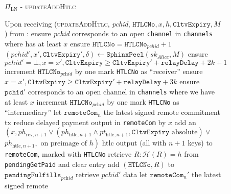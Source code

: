   \begin{figure}[H]
    \begin{protocolbox}{$\Pi_{\mathrm{LN}}$ - \textsc{updateAddHtlc}}
      \begin{algorithmic}[1]
        \State Upon receiving (\textsc{updateAddHtlc}, \textit{pchid},
        $\mathtt{HTLCNo}, x, h, \mathtt{CltvExpiry}, M$) from \bob:
        \Indent
          \State ensure \textit{pchid} corresponds to an open \texttt{channel}
          in \texttt{channels} where \bob{} has at least $x$
          \State ensure $\mathtt{HTLCNo} = \mathtt{HTLCNo}_{\mathit{pchid}} + 1$
          \State $\left(\mathit{pchid}', x', \mathtt{CltvExpiry}',
          \delta\right) \gets \mathtt{SphinxPeel}\left(sk_{\textit{Alice}},
          M\right)$
            \State ensure $\mathit{pchid}' = \bot, x = x', \mathtt{CltvExpiry}
            \geq \mathtt{CltvExpiry}' + \mathtt{relayDelay} + 2k + 1$
            \State increment $\mathtt{HTLCNo}_{\textit{pchid}}$ by one
            \State mark \texttt{HTLCNo} as ``receiver''
          \Else {}
            \State ensure $x = x', \mathtt{CltvExpiry} \geq \mathtt{CltvExpiry}'
            + \mathtt{relayDelay} + 3k$
            \State ensure $\mathtt{pchid}'$ corresponds to an open channel in
            \texttt{channels} where we have at least $x$
            \State increment $\mathtt{HTLCNo}_{\textit{pchid}}$ by one
            \State mark \texttt{HTLCNo} as ``intermediary''
          \EndIf
          \State let $\mathtt{remoteCom}_n$ the latest signed remote commitment
          tx
          \State reduce delayed payment output in \texttt{remoteCom} by $x$
          \State add an $\left(x, ph_{\mathrm{rev}, n+1} \vee
          \left(ph_{\mathrm{htlc}, n+1} \wedge pt_{\mathrm{htlc}, n+1},
          \mathtt{CltvExpiry} \text{ absolute}\right) \vee\right.$
          $\left.ph_{\mathrm{htlc}, n+1}, \text{ on preimage of } h\right)$ htlc
          output (all with $n+1$ keys) to \texttt{remoteCom}, marked with
          \texttt{HTLCNo}
            \State retrieve $R : \mathcal{H}\left(R\right) = h$ from
            \texttt{pendingGetPaid} and clear entry
            \State add $\left(\mathtt{HTLCNo}, R\right)$ to
            $\mathtt{pendingFulfills}_{\textit{pchid}}$
            
            \State retrieve $\mathit{pchid}'$ data
            \State let $\mathtt{remoteCom}_n'$ the latest signed remote

\end{algorithmic}
\end{protocolbox}
\end{figure}
